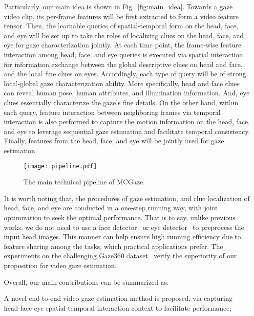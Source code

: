 \documentclass[journal]{IEEEtran}
\begin{document}
Particularly, our main idea is shown in Fig.~\ref{fig:main_idea}. Towards a gaze video clip, its per-frame features will be first extracted to form a video feature tensor. Then, the learnable queries of spatial-temporal form on the head, face, and eye will be set up to take the roles of localizing clues on the head, face, and eye for gaze characterization jointly. At each time point, the frame-wise feature interaction among head, face, and eye queries is executed via spatial interaction for information exchange between the global descriptive clues on head and face, and the local fine clues on eyes. Accordingly, each type of query will be of strong local-global gaze characterization ability. More specifically, head and face clues can reveal human pose, human attributes, and illumination information. And, eye clues essentially characterize the gaze's fine details. On the other hand, within each query, feature interaction between neighboring frames via temporal interaction is also performed to capture the motion information on the head, face, and eye to leverage sequential gaze estimation and facilitate temporal consistency. Finally, features from the head, face, and eye will be jointly used for gaze estimation.
\begin{figure*}[t]
\vspace{-6mm}
\begin{center}
\texttt{[image: pipeline.pdf]}
\vspace{-5mm}
\end{center}
        \caption{The main technical pipeline of MCGaze.}
\label{fig:pipeline}
\vspace{-5mm}
\end{figure*}
It is worth noting that, the procedures of gaze estimation, and clue localization of head, face, and eye are conducted in a one-step running way, with joint optimization to seek the optimal performance. That is to say, unlike previous works, we do not need to use a face detector~\cite{mtcnn} or eye detector~\cite{SPL_Facial_Landmark,faciallandmark_tip_23} to preprocess the input head images. This manner can help ensure high running efficiency due to feature sharing among the tasks, which practical applications prefer. The experiments on the challenging Gaze360 dataset~\cite{kellnhofer2019gaze360} verify the superiority of our proposition for video gaze estimation.

Overall, our main contributions can be summarized as:

 A novel end-to-end video gaze estimation method is proposed, via capturing head-face-eye spatial-temporal interaction context to facilitate performance;
\end{document}

